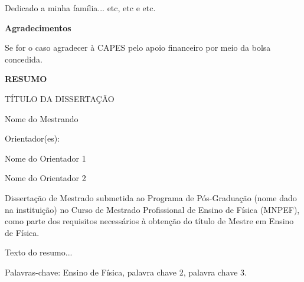 \documentclass[a4paper,12pt,oneside]{book}
\begin{document}
\hfill \parbox{10.0cm} {\noindent Dedicado a minha família... etc, etc e etc.}

\newpage
\begin{center}
\textbf{Agradecimentos}
\end{center}
	
Se for o caso agradecer à CAPES pelo apoio financeiro por meio da bolsa
concedida.

\newpage

\begin{center}
	\textbf{RESUMO}
\end{center}

\begin{center}	
	TÍTULO DA DISSERTAÇÃO
\end{center}

\begin{center}
	Nome do Mestrando
\end{center}

\begin{center}
	Orientador(es):
	
Nome do Orientador 1

Nome do Orientador 2  
\end{center} 

\begin{center} \justifying
	\noindent Dissertação de Mestrado submetida ao Programa de Pós-Graduação (nome dado na instituição) no Curso de Mestrado Profissional de Ensino de Física (MNPEF), como parte dos requisitos necessários à obtenção do título de Mestre em Ensino de Física.
\end{center}


\noindent Texto do resumo...


Palavras-chave: Ensino de Física, palavra chave 2, palavra chave 3.

\vspace{14cm} %
\end{document}
